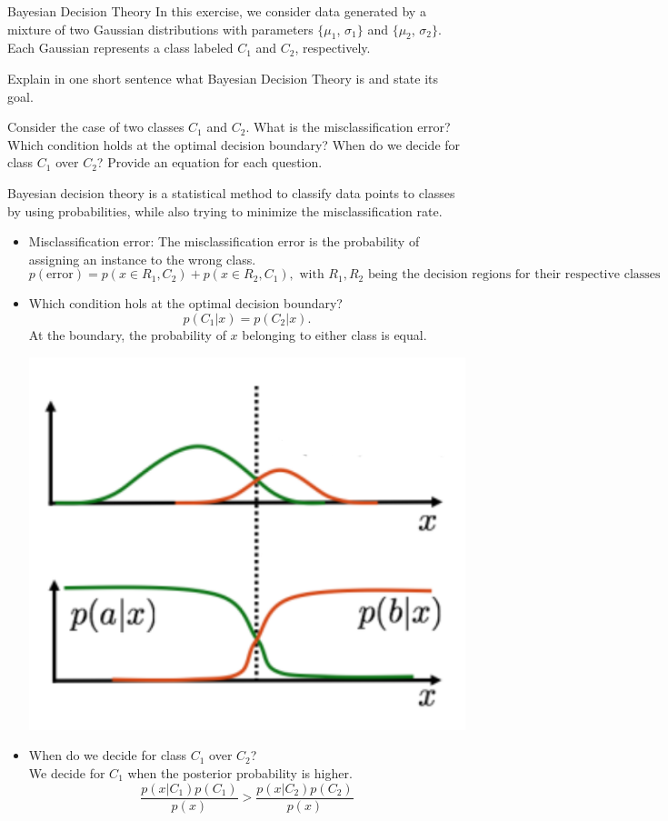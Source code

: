 \documentclass[
	english,
        solution=true
	]{tudaexercise}
\begin{document}
\newpage

\begin{task}[points=4 + 8 + 8]{Bayesian Decision Theory}
In this exercise, we consider data generated by a mixture of two Gaussian distributions with parameters $\{\mu_1$, $\sigma_1\}$ and $\{\mu_2$, $\sigma_2\}$. Each Gaussian represents a class labeled $C_1$ and $C_2$, respectively. 

\begin{subtask}[points=4,title=Optimal Boundary]
Explain in one short sentence what Bayesian Decision Theory is and state its goal. 

Consider the case of two classes $C_1$ and $C_2$. What is the misclassification error? Which condition holds at the optimal decision boundary? When do we decide for class $C_1$ over $C_2$? Provide an equation for each question.

\begin{solution}
Bayesian decision theory is a statistical method to classify data points to classes by using probabilities, while also trying to minimize the misclassification rate.\\

\begin{itemize}
    \item Misclassification error: The misclassification error is the probability of assigning an instance to the wrong class. 
    \[p(\text{error})=p(x\in R_1, C_2)+p(x\in R_2, C_1), \text{ with $R_1, R_2$ being the decision regions for their respective classes}\]
    
    \item Which condition hols at the optimal decision boundary?
    \[p(C_1|x)=p(C_2|x).\]
    At the boundary, the probability of $x$ belonging to either class is equal.
    \begin{center}
        \includegraphics[width=0.5\linewidth]{boundaries.png}
    \end{center}
    \item When do we decide for class $C_1$ over $C_2$?\\
    We decide for $C_1$ when the posterior probability is higher.
    \[\frac{p(x|C_1)p(C_1)}{p(x)} > \frac{p(x|C_2)p(C_2)}{p(x)}\]
\end{itemize}
\end{solution}
\end{subtask}



\end{task}
\end{document}
